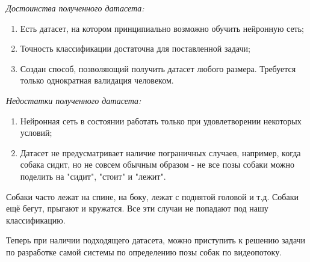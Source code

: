 \textit{Достоинства полученного датасета:}
\begin{enumerate}[wide, labelwidth=!, labelindent=1.25cm]
    \item Есть датасет, на котором принципиально возможно обучить нейронную сеть;
    \item Точность классификации достаточна для поставленной задачи;
    \item Создан способ, позволяющий получить датасет любого размера. Требуется только однократная валидация человеком.
\end{enumerate}


\textit{Недостатки полученного датасета:}
\begin{enumerate}[wide, labelwidth=!, labelindent=1.25cm]
    \item Нейронная сеть в состоянии работать только при удовлетворении некоторых условий;
    \item Датасет не предусматривает наличие пограничных случаев, например, когда собака сидит, но не совсем обычным образом - не все позы собаки можно поделить на "сидит", "стоит" и "лежит".
\end{enumerate}

Собаки часто лежат на спине, на боку, лежат с поднятой головой и т.д. Собаки ещё бегут, прыгают и кружатся. Все эти случаи не попадают под нашу классификацию.


Теперь при наличии подходящего датасета, можно приступить к решению задачи по разработке самой системы по определению позы собак по видеопотоку.
